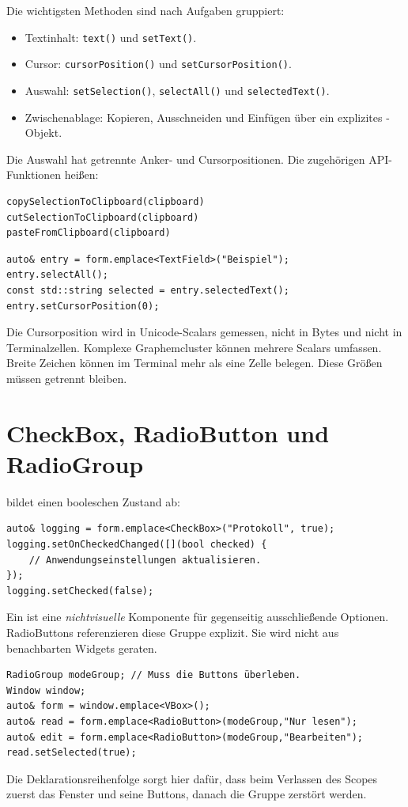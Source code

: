 Die wichtigsten Methoden sind nach Aufgaben gruppiert:
\begin{itemize}
\item Textinhalt: \texttt{text()} und \texttt{setText()}.
\item Cursor: \texttt{cursorPosition()} und \texttt{setCursorPosition()}.
\item Auswahl: \texttt{setSelection()}, \texttt{selectAll()}
und \texttt{selectedText()}.
\item Zwischenablage: Kopieren, Ausschneiden und
Einfügen über ein explizites -Objekt.
\end{itemize}
Die Auswahl hat getrennte Anker- und Cursorpositionen.
Die zugehörigen API-Funktionen heißen:
\begin{lstlisting}[language={},numbers=none]
copySelectionToClipboard(clipboard)
cutSelectionToClipboard(clipboard)
pasteFromClipboard(clipboard)
\end{lstlisting}

\begin{lstlisting}[language=SASDCpp]
auto& entry = form.emplace<TextField>("Beispiel");
entry.selectAll();
const std::string selected = entry.selectedText();
entry.setCursorPosition(0);
\end{lstlisting}
Die Cursorposition wird in Unicode-Scalars gemessen,
nicht in Bytes und nicht in Terminalzellen. Komplexe
Graphemcluster können mehrere Scalars umfassen.
Breite Zeichen können im Terminal mehr als eine Zelle
belegen. Diese Größen müssen getrennt bleiben.

\section{CheckBox, RadioButton und RadioGroup}
 bildet einen booleschen Zustand ab:
\begin{lstlisting}[language=SASDCpp]
auto& logging = form.emplace<CheckBox>("Protokoll", true);
logging.setOnCheckedChanged([](bool checked) {
    // Anwendungseinstellungen aktualisieren.
});
logging.setChecked(false);
\end{lstlisting}
Ein  ist eine \emph{nichtvisuelle}
Komponente für gegenseitig ausschließende Optionen.
RadioButtons referenzieren diese Gruppe explizit.
Sie wird nicht aus benachbarten Widgets geraten.

\begin{lstlisting}[language=SASDCpp]
RadioGroup modeGroup; // Muss die Buttons überleben.
Window window;
auto& form = window.emplace<VBox>();
auto& read = form.emplace<RadioButton>(modeGroup,"Nur lesen");
auto& edit = form.emplace<RadioButton>(modeGroup,"Bearbeiten");
read.setSelected(true);
\end{lstlisting}
Die Deklarationsreihenfolge sorgt hier dafür,
dass beim Verlassen des Scopes zuerst das Fenster
und seine Buttons, danach die Gruppe zerstört werden.

